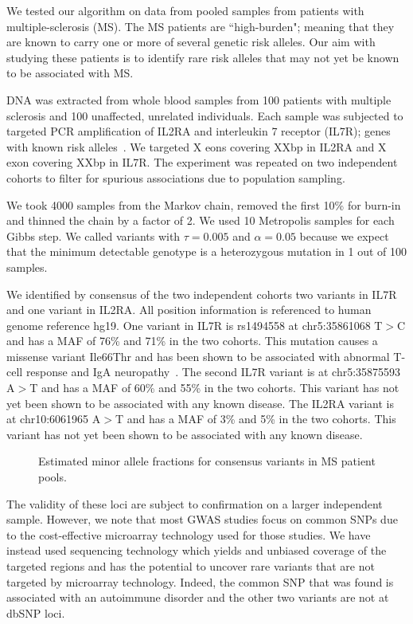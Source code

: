 \documentclass[11pt,reqno]{amsart}
\begin{document}
We tested our algorithm on data from pooled samples from patients with multiple-sclerosis (MS). The MS patients are ``high-burden"; meaning that they are known to carry one or more of several genetic risk alleles. Our aim with studying these patients is to identify rare risk alleles that may not yet be known to be associated with MS. 

DNA was extracted from whole blood samples from 100 patients with multiple sclerosis and 100 unaffected, unrelated individuals. Each sample was subjected to targeted PCR amplification of IL2RA and interleukin 7 receptor (IL7R); genes with known risk alleles~\cite{HauserNEJM2007}. We targeted X eons covering XXbp in IL2RA and X exon covering XXbp in IL7R. The experiment was repeated on two independent cohorts to filter for spurious associations due to population sampling.

We took 4000 samples from the Markov chain, removed the first 10\% for burn-in and thinned the chain by a factor of 2. We used 10 Metropolis samples for each Gibbs step. We called variants with $\tau = 0.005$ and $\alpha = 0.05$ because we expect that the minimum detectable genotype is a heterozygous mutation in 1 out of 100 samples. 

We identified by consensus of the two independent cohorts two variants in IL7R and one variant in IL2RA. All position information is referenced to human genome reference hg19. One variant in IL7R is rs1494558 at chr5:35861068 T$>$C and has a MAF of 76\% and 71\% in the two cohorts. This mutation causes a missense variant Ile66Thr and has been shown to be associated with abnormal T-cell response and IgA neuropathy~\cite{HahnCho2011}. The second IL7R variant is at chr5:35875593 A$>$T and has a MAF of 60\% and 55\% in the two cohorts. This variant has not yet been shown to be associated with any known disease. The IL2RA variant is at chr10:6061965 A$>$T and has a MAF  of 3\% and 5\% in the two cohorts. This variant has not yet been shown to be associated with any known disease.

\begin{figure}[h]
\begin{center}
\caption{Estimated minor allele fractions for consensus variants in MS patient pools.}
\label{fig:MS_MAF}
\end{center}
\end{figure}

The validity of these loci are subject to confirmation on a larger independent sample. However, we note that most GWAS studies focus on common SNPs due to the cost-effective microarray technology used for those studies. We have instead used sequencing technology which yields and unbiased coverage of the targeted regions and has the potential to uncover rare variants that are not targeted by microarray technology. Indeed, the common SNP that was found is associated with an autoimmune disorder and the other two variants are not at dbSNP loci.
\end{document}
